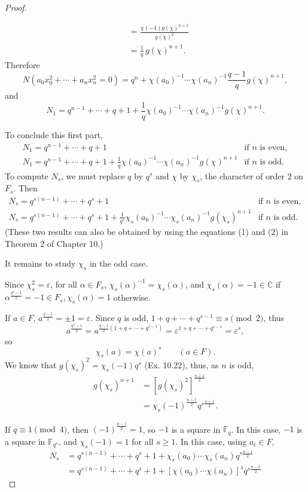 \documentclass[11pt,a4paper]{article}
\newcommand{\C}{\mathbb{C}}
\newcommand{\F}{\mathbb{F}}
\begin{document}
\begin{proof}
\begin{enumerate}
\begin{align*}
&=\frac{\chi(-1) g(\chi)^{n+1}}{g(\chi)^2}\\
&= \frac{1}{q}\,  g(\chi)^{n+1}.
 \end{align*}
 Therefore
 $$N(a_0x_0^2+\cdots+a_n x_n^2=0)  = q^n + \chi(a_0)^{-1}\cdots \chi(a_n)^{-1} \frac{q-1}{q} g(\chi)^{n+1},$$
 and 
 $$N_1 = q^{n-1} + \cdots + q + 1 + \frac{1}{q} \chi(a_0)^{-1}\cdots \chi(a_n)^{-1}g(\chi)^{n+1}.$$
\end{enumerate}
To conclude this first part,
$$
\begin{array}{ll}
N_1 = q^{n-1} + \cdots + q + 1 &\text{if  $n$ is even},\\
N_1 = q^{n-1} + \cdots + q + 1 + \frac{1}{q} \chi(a_0)^{-1}\cdots \chi(a_n)^{-1}g(\chi)^{n+1}& \text{if $n$ is odd}.
\end{array}
$$
To compute $N_s$, we must replace $q$ by $q^s$ and $\chi$ by $\chi_s$, the character of order $2$ on $F_s$. Then
$$
\begin{array}{ll}
N_s = q^{s(n-1)} + \cdots + q^s + 1 &\text{if  $n$ is even},\\
N_s = q^{s(n-1)} + \cdots + q^s + 1 + \frac{1}{q^s} \chi_s(a_0)^{-1}\cdots \chi_s(a_n)^{-1}g(\chi_s)^{n+1}& \text{if $n$ is odd}.
\end{array}
$$
(These two results can also be obtained by using the equations (1) and (2) in Theorem 2 of Chapter 10.)
\bigskip

It remains to study $\chi_s$ in the odd case. 

Since $\chi_s^2 = \varepsilon$, for all $\alpha \in F_s$, $\chi_s(\alpha)^{-1} = \chi_s(\alpha)$, and $\chi_s(\alpha) = -1 \in \C$ if $\alpha^\frac{q^s - 1}{2} = -1 \in F_s, \chi_s(\alpha) = 1$ otherwise.

If $a \in F$, $a^\frac{q-1}{2} = \pm 1 = \varepsilon$. Since $q$ is odd, $1+q+\cdots+q^{s-1} \equiv s \pmod 2$, thus
$$a^{\frac{q^s-1}{2}} = a^{\frac{q-1}{2} (1+q+\cdots + q^{s-1})} =\varepsilon^{1+q+\cdots + q^{s-1}} = \varepsilon^{s},$$
so
$$\chi_s(a) = \chi(a)^s \qquad (a \in F).$$
We know that $g(\chi_s)^2 = \chi_s(-1) q^s$ (Ex. 10.22), thus, as $n$ is odd,
\begin{align*}
g(\chi_s)^{n+1} &= \left[g(\chi_s)^2 \right]^{\frac{n+1}{2}}\\
&=\chi_s(-1)^\frac{n+1}{2} q^{s \frac{n+1}{2}}.
\end{align*}

If $q\equiv 1 \pmod 4$, then $(-1)^{\frac{q-1}{2}} = 1$, so $-1$ is a square in $\F_q$. In this case, $-1$ is a square in $\F_{q^s}$, and $\chi_s(-1) = 1$ for all $s\geq 1$.
In this case, using $a_i \in F$,
\begin{align*}
N_s &= q^{s(n-1)} + \cdots + q^s + 1 + \chi_s(a_0)\cdots \chi_s(a_n)q^{s\frac{n-1}{2}}\\
&= q^{s(n-1)} + \cdots + q^s + 1 + [\chi(a_0)\cdots \chi(a_n)]^s q^{s\frac{n-1}{2}}
\end{align*}


\end{proof}
\end{document}
